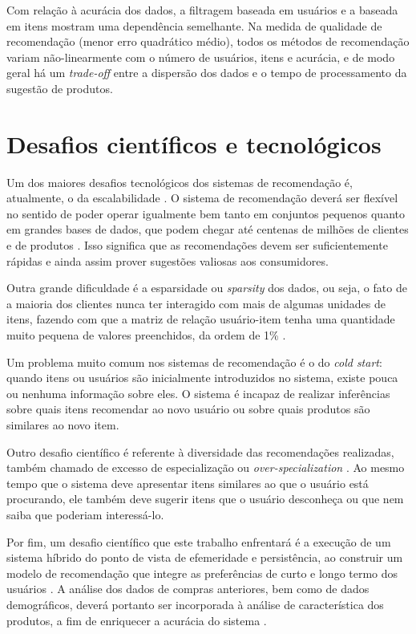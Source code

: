 Com relação à acurácia dos dados, a filtragem baseada em usuários e a baseada em itens mostram uma dependência semelhante. Na medida de qualidade de recomendação (menor erro quadrático médio), todos os métodos de recomendação variam não-linearmente com o número de usuários, itens e acurácia, e de modo geral há um \textit{trade-off} entre a dispersão dos dados e o tempo de processamento da sugestão de produtos. 

\section{Desafios científicos e tecnológicos} %
\label{sec:desafios_cient_ficos_e_tecnol_gicos}

Um dos maiores desafios tecnológicos dos sistemas de recomendação é, atualmente, o da escalabilidade \cite{wei2007survey}. O sistema de recomendação deverá ser flexível no sentido de poder operar igualmente bem tanto em conjuntos pequenos quanto em grandes bases de dados, que podem chegar até centenas de milhões de clientes \cite{amazoncustomers} e de produtos \cite{amazonproducts}. Isso significa que as recomendações devem ser suficientemente rápidas e ainda assim prover sugestões valiosas aos consumidores.

Outra grande dificuldade é a esparsidade ou \textit{sparsity} dos dados, ou seja, o fato de a maioria dos clientes nunca ter interagido com mais de algumas unidades de itens, fazendo com que a matriz de relação usuário-item tenha uma quantidade muito pequena de valores preenchidos, da ordem de 1\% \cite{fennell2009collaborative}.

Um problema muito comum nos sistemas de recomendação é o do \textit{cold start}: quando itens ou usuários são inicialmente introduzidos no sistema, existe pouca ou nenhuma informação sobre eles. O sistema é incapaz de realizar inferências sobre quais itens recomendar ao novo usuário ou sobre quais produtos são similares ao novo item. 

Outro desafio científico é referente à diversidade das recomendações realizadas, também chamado de excesso de especialização ou \textit{over-specialization} \cite{adomavicius2005toward}. Ao mesmo tempo que o sistema deve apresentar itens similares ao que o usuário está procurando, ele também deve sugerir itens que o usuário desconheça ou que nem saiba que poderiam interessá-lo. 

Por fim, um desafio científico que este trabalho enfrentará é a execução de um sistema híbrido do ponto de vista de efemeridade e persistência, ao construir um modelo de recomendação que integre as preferências de curto e longo termo dos usuários \cite{schafer1999recommender}. A análise dos dados de compras anteriores, bem como de dados demográficos, deverá portanto ser incorporada à análise de característica dos produtos, a fim de enriquecer a acurácia do sistema \cite{wei2007survey}.


